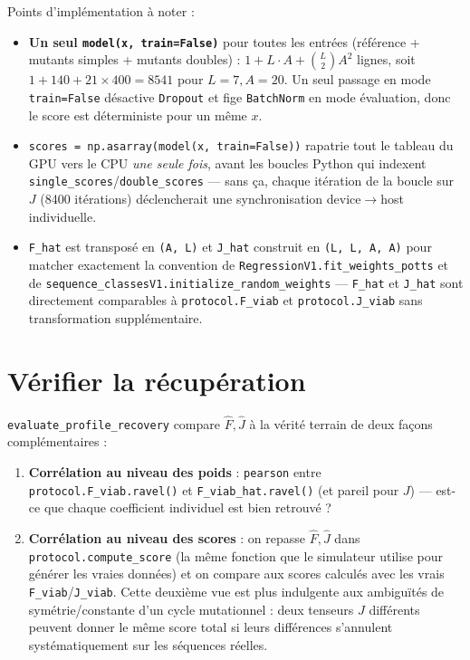 \documentclass[11pt,a4paper]{article}
\begin{document}
Points d'implémentation à noter :
\begin{itemize}
    \item \textbf{Un seul \texttt{model(x, train=False)}} pour toutes les entrées (référence
          + mutants simples + mutants doubles) : $1 + L\cdot A + \binom{L}{2}A^2$ lignes, soit
          $1 + 140 + 21\times400 = 8541$ pour $L=7,A=20$. Un seul passage en mode
          \texttt{train=False} désactive \texttt{Dropout} et fige \texttt{BatchNorm} en mode
          évaluation, donc le score est déterministe pour un même $x$.
    \item \texttt{scores = np.asarray(model(x, train=False))} rapatrie tout le tableau du GPU
          vers le CPU \emph{une seule fois}, avant les boucles Python qui indexent
          \texttt{single\_scores}/\texttt{double\_scores} --- sans ça, chaque itération de la
          boucle sur $J$ (8400 itérations) déclencherait une synchronisation device$\to$host
          individuelle.
    \item \texttt{F\_hat} est transposé en \texttt{(A, L)} et \texttt{J\_hat} construit en
          \texttt{(L, L, A, A)} pour matcher exactement la convention de
          \texttt{RegressionV1}\allowbreak\texttt{.fit\_weights\_potts} et de
          \texttt{sequence\_classesV1}\allowbreak\texttt{.initialize\_random\_weights} ---
          \texttt{F\_hat} et \texttt{J\_hat} sont directement comparables à
          \texttt{protocol.F\_viab} et \texttt{protocol.J\_viab} sans transformation
          supplémentaire.
\end{itemize}

\section{Vérifier la récupération}

\texttt{evaluate\_profile\_recovery} compare $\hat F,\hat J$ à la vérité terrain de deux façons
complémentaires :

\begin{enumerate}
    \item \textbf{Corrélation au niveau des poids} : \texttt{pearson} entre
          \texttt{protocol}\allowbreak\texttt{.F\_viab.ravel()} et
          \texttt{F\_viab\_hat}\allowbreak\texttt{.ravel()} (et pareil pour $J$) --- est-ce que
          chaque coefficient individuel est bien retrouvé ?
    \item \textbf{Corrélation au niveau des scores} : on repasse $\hat F,\hat J$ dans
          \texttt{protocol.compute\_score} (la même fonction que le simulateur utilise pour
          générer les vraies données) et on compare aux scores calculés avec les vrais
          \texttt{F\_viab}/\texttt{J\_viab}. Cette deuxième vue est plus indulgente aux
          ambiguïtés de symétrie/constante d'un cycle mutationnel : deux tenseurs $J$
          différents peuvent donner le même score total si leurs différences s'annulent
          systématiquement sur les séquences réelles.
\end{enumerate}
\end{document}

